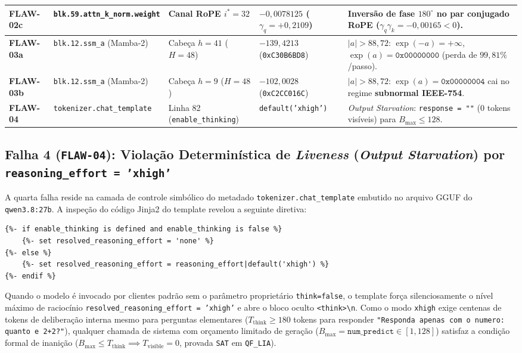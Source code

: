 \documentclass[11pt,a4paper]{article}
\theoremstyle{definition}
\begin{document}
\begin{table}[H]
\begin{tabularx}{\textwidth}{l l l l X}
\textbf{FLAW-02c} & \texttt{blk.59.attn\_k\_norm.weight} & Canal RoPE $i^* = 32$ & $-0{,}0078125$ ($\gamma_q = +0{,}2109$) & Inversão de fase $180^\circ$ no par conjugado RoPE ($\gamma_q\gamma_k = -0{,}00165 < 0$). \\
\midrule
\textbf{FLAW-03a} & \texttt{blk.12.ssm\_a} (Mamba-2) & Cabeça $h = 41$ ($H=48$) & $-139{,}4213$ (\texttt{0xC30B6BD8}) & $|a| > 88{,}72$: $\exp(-a)=+\infty$, $\exp(a)=\texttt{0x00000000}$ (perda de $99{,}81\%$/passo). \\
\textbf{FLAW-03b} & \texttt{blk.12.ssm\_a} (Mamba-2) & Cabeça $h = 9$ ($H=48$) & $-102{,}0028$ (\texttt{0xC2CC016C}) & $|a| > 88{,}72$: $\exp(a)=\texttt{0x00000004}$ cai no regime \textbf{subnormal IEEE-754}. \\
\midrule
\textbf{FLAW-04} & \texttt{tokenizer.chat\_template} & Linha 82 (\texttt{enable\_thinking}) & \texttt{default('xhigh')} & \textit{Output Starvation}: \texttt{response = ""} (0 tokens visíveis) para $B_{\max} \le 128$. \\
\bottomrule
\end{tabularx}
\end{table}

\subsection{Falha 4 (\texttt{FLAW-04}): Violação Determinística de \textit{Liveness} (\textit{Output Starvation}) por \texttt{reasoning\_effort = 'xhigh'}}

A quarta falha reside na camada de controle simbólico do metadado \texttt{tokenizer.chat\_template} embutido no arquivo GGUF do \texttt{qwen3.8:27b}. A inspeção do código Jinja2 do template revelou a seguinte diretiva:
\begin{verbatim}
{%- if enable_thinking is defined and enable_thinking is false %}
    {%- set resolved_reasoning_effort = 'none' %}
{%- else %}
    {%- set resolved_reasoning_effort = reasoning_effort|default('xhigh') %}
{%- endif %}
\end{verbatim}
Quando o modelo é invocado por clientes padrão sem o parâmetro proprietário \texttt{think=false}, o template força silenciosamente o nível máximo de raciocínio \texttt{resolved\_reasoning\_effort = 'xhigh'} e abre o bloco oculto \texttt{<think>\textbackslash n}. Como o modo \texttt{xhigh} exige centenas de tokens de deliberação interna mesmo para perguntas elementares ($T_{\text{think}} \ge 180$ tokens para responder \texttt{"Responda apenas com o numero: quanto e 2+2?"}), qualquer chamada de sistema com orçamento limitado de geração ($B_{\max} = \texttt{num\_predict} \in [1, 128]$) satisfaz a condição formal de inanição ($B_{\max} \le T_{\text{think}} \implies T_{\text{visible}} = 0$, provada \texttt{SAT} em \texttt{QF\_LIA}).
\end{document}
